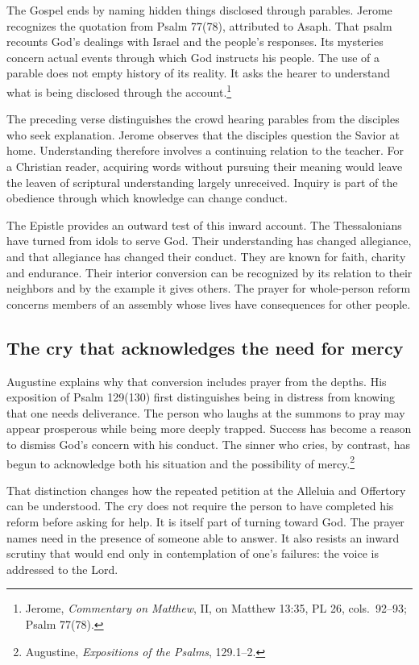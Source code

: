 The Gospel ends by naming hidden things disclosed through parables. Jerome recognizes the quotation from Psalm 77(78), attributed to Asaph. That psalm recounts God's dealings with Israel and the people's responses. Its mysteries concern actual events through which God instructs his people. The use of a parable does not empty history of its reality. It asks the hearer to understand what is being disclosed through the account.\footnote{Jerome, \textit{Commentary on Matthew}, II, on Matthew 13:35, PL 26, cols.~92--93; Psalm 77(78).}

The preceding verse distinguishes the crowd hearing parables from the disciples who seek explanation. Jerome observes that the disciples question the Savior at home. Understanding therefore involves a continuing relation to the teacher. For a Christian reader, acquiring words without pursuing their meaning would leave the leaven of scriptural understanding largely unreceived. Inquiry is part of the obedience through which knowledge can change conduct.

The Epistle provides an outward test of this inward account. The Thessalonians have turned from idols to serve God. Their understanding has changed allegiance, and that allegiance has changed their conduct. They are known for faith, charity and endurance. Their interior conversion can be recognized by its relation to their neighbors and by the example it gives others. The prayer for whole-person reform concerns members of an assembly whose lives have consequences for other people.

\subsection{The cry that acknowledges the need for mercy}

Augustine explains why that conversion includes prayer from the depths. His exposition of Psalm 129(130) first distinguishes being in distress from knowing that one needs deliverance. The person who laughs at the summons to pray may appear prosperous while being more deeply trapped. Success has become a reason to dismiss God's concern with his conduct. The sinner who cries, by contrast, has begun to acknowledge both his situation and the possibility of mercy.\footnote{Augustine, \textit{Expositions of the Psalms}, 129.1--2.}

That distinction changes how the repeated petition at the Alleluia and Offertory can be understood. The cry does not require the person to have completed his reform before asking for help. It is itself part of turning toward God. The prayer names need in the presence of someone able to answer. It also resists an inward scrutiny that would end only in contemplation of one's failures: the voice is addressed to the Lord.

